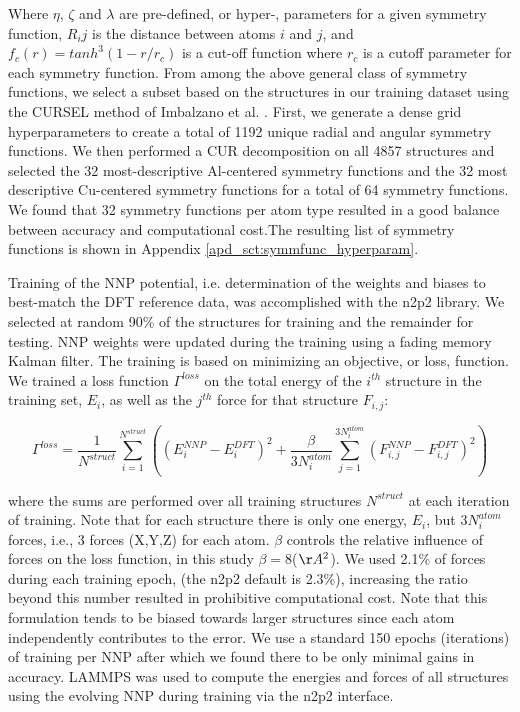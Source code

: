 \documentclass{article}
\begin{document}
Where $\eta$, $\zeta$ and $\lambda$ are pre-defined, or hyper-, parameters for a given symmetry function, $R_ij$ is the distance between atoms $i$ and $j$, and $f_c(r) = tanh^3(1-r/r_c)$ is a cut-off function where $r_c$ is a cutoff parameter for each symmetry function.
From among the above general class of symmetry functions, we select a subset based on the structures in our training dataset using the CURSEL method of Imbalzano et al. \cite{Imbalzano2018}.
First, we generate a dense grid hyperparameters to create a total of 1192 unique radial and angular symmetry functions.
We then performed a CUR decomposition on all 4857 structures and selected the 32 most-descriptive Al-centered symmetry functions and the 32 most descriptive Cu-centered symmetry functions for a total of 64 symmetry functions.
We found that 32 symmetry functions per atom type resulted in a good balance between accuracy and computational cost.The resulting list of symmetry functions is shown in Appendix \ref{apd_sct:symmfunc_hyperparam}.

Training of the NNP potential, i.e. determination of the weights and biases to best-match the DFT reference data, was accomplished with the n2p2 library\cite{Singraber2019ParallelPotentials}\cite{Singraber2019Library-BasedPotentials}.  We selected at random 90\% of the structures for training and the remainder for testing.
NNP weights were updated during the training using a fading memory Kalman filter.
The training is based on minimizing an objective, or loss, function.
We trained a loss function $\Gamma^{loss}$ on the total energy of the $i^{th}$ structure in the training set, $E_i$, as well as the $j^{th}$ force for that structure $F_{i,j}$:

\begin{equation}
\Gamma^{loss} = \frac{1}{N^{struct}} \sum^{N^{struct}}_{i=1}((E^{NNP}_i-E^{DFT}_i)^2+\frac{\beta}{3N^{atom}_i}\sum^{3N^{atom}_{i}}_{j=1}(F^{NNP}_{i,j}-F^{DFT}_{i,j})^2)
\end{equation}

where the sums are performed over all training structures $N^{struct}$ at each iteration of training.
Note that for each structure there is only one energy, $E_i$, but $3N^{atom}_i$ forces, i.e., 3 forces (X,Y,Z) for each atom.
$\beta$ controls the relative influence of forces on the loss function, in this study $\beta = 8$($\AA^2$).
We used 2.1\% of forces during each training epoch, (the n2p2 default is 2.3\%), increasing the ratio beyond this number resulted in prohibitive computational cost.
Note that this formulation tends to be biased towards larger structures since each atom independently contributes to the error. 
We use a standard 150 epochs (iterations) of training per NNP after which we found there to be only minimal gains in accuracy.  LAMMPS\cite{Plimpton1995} was used to compute the energies and forces of all structures using the evolving NNP during training via the n2p2 interface. 
\end{document}
